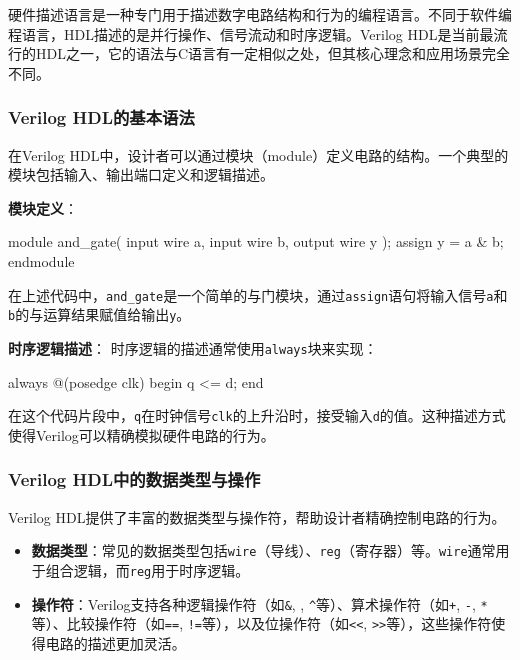 硬件描述语言是一种专门用于描述数字电路结构和行为的编程语言。不同于软件编程语言，HDL描述的是并行操作、信号流动和时序逻辑。Verilog HDL是当前最流行的HDL之一，它的语法与C语言有一定相似之处，但其核心理念和应用场景完全不同。

\subsubsection{Verilog HDL的基本语法}\label{sec:03-digital-logic-020}

在Verilog HDL中，设计者可以通过模块（module）定义电路的结构。一个典型的模块包括输入、输出端口定义和逻辑描述。

\textbf{模块定义}：

\begin{CodeBlock}[language=BookVerilog]
module and_gate(
    input wire a,
    input wire b,
    output wire y
);
    assign y = a & b;
endmodule
\end{CodeBlock}

在上述代码中，\texttt{and\_gate}是一个简单的与门模块，通过\texttt{assign}语句将输入信号\texttt{a}和\texttt{b}的与运算结果赋值给输出\texttt{y}。

\textbf{时序逻辑描述}： 时序逻辑的描述通常使用\texttt{always}块来实现：

\begin{CodeBlock}[language=BookVerilog]
always @(posedge clk) begin
    q <= d;
end
\end{CodeBlock}

在这个代码片段中，\texttt{q}在时钟信号\texttt{clk}的上升沿时，接受输入\texttt{d}的值。这种描述方式使得Verilog可以精确模拟硬件电路的行为。

\subsubsection{Verilog HDL中的数据类型与操作}\label{sec:03-digital-logic-021}

Verilog HDL提供了丰富的数据类型与操作符，帮助设计者精确控制电路的行为。

\begin{itemize}
\tightlist
\item
  \textbf{数据类型}：常见的数据类型包括\texttt{wire}（导线）、\texttt{reg}（寄存器）等。\texttt{wire}通常用于组合逻辑，而\texttt{reg}用于时序逻辑。
\item
  \textbf{操作符}：Verilog支持各种逻辑操作符（如\texttt{\&}, \texttt{\textbar{}}, \texttt{\^{}}等）、算术操作符（如\texttt{+}, \texttt{-}, \texttt{*}等）、比较操作符（如\texttt{==}, \texttt{!=}等），以及位操作符（如\texttt{\textless{}\textless{}}, \texttt{\textgreater{}\textgreater{}}等），这些操作符使得电路的描述更加灵活。
\end{itemize}

